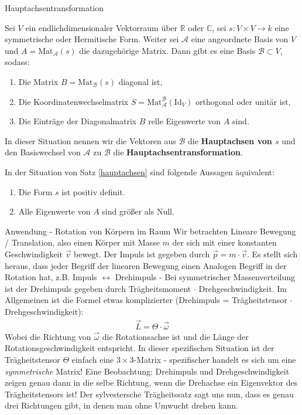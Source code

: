 \documentclass{report}
\newcommand{\tbf}[1]{\textbf{#1}}
\newcommand{\mc}[1]{\mathcal{#1}}
\newcommand{\bC}{\mathbb{C}}
\newcommand{\bR}{\mathbb{R}}
\newcommand{\vp}{\vec{p}}
\newcommand{\vv}{\vec{v}}
\newcommand{\Mat}[3]{\text{Mat}^{#1}_{#2}\left(#3\right)}
\begin{document}
\begin{section}{Hauptachsentransformation}
 \begin{theorem}
 \label{thrm:hauptachsen}
  Sei $V$ ein endlichdimensionaler Vektorraum über $\bR$ oder $\bC$, sei $s : V \times V \to k$ eine symmetrische oder Hermitische Form. Weiter sei $\mc{A}$ eine angeordnete Basis von $V$ und $A = \text{Mat}_\mc{A}(s)$ die dazugehörige Matrix. Dann gibt es eine Basis $\mc{B} \subset V$, sodass:
  \begin{enumerate}
   \item Die Matrix $B = \text{Mat}_\mc{B}(s)$ diagonal ist,
   \item Die Koordinatenwechselmatrix $S = \Mat{\mc{B}}{\mc{A}}{\text{Id}_V}$ orthogonal oder unitär ist,
   \item Die Einträge der Diagonalmatrix $B$ relle Eigenwerte von $A$ sind.
  \end{enumerate}
 \end{theorem}
 \begin{definition}
   In dieser Situation nennen wir die Vektoren aus $\mc{B}$ die \tbf{Hauptachsen von $s$} und den Basiswechsel von $\mc{A}$ zu $\mc{B}$ die \tbf{Hauptachsentransformation}.
 \end{definition}
 \begin{theorem}
  In der Situation von Satz \ref{hauptachsen} sind folgende Aussagen äquivalent:
  \begin{enumerate}
   \item Die Form $s$ ist positiv definit.
   \item Alle Eigenwerte von $A$ sind größer als Null.
  \end{enumerate}
 \end{theorem}
 \begin{subsection}{Anwendung - Rotation von Körpern im Raum}
  Wir betrachten Lineare Bewegung / Translation, also einen Körper mit Masse $m$ der sich mit einer konstanten Geschwindigkeit $\vv$ bewegt. Der Impuls ist gegeben durch $\vp = m \cdot \vv$. Es stellt sich heraus, dass jeder Begriff der linearen Bewegung einen Analogen Begriff in der Rotation hat, z.B. Impuls $\leftrightarrow$ Drehimpuls - Bei symmetrischer Massenverteilung ist der Drehimpuls gegeben durch Trägheitsmoment $\cdot$ Drehgeschwindigkeit. Im Allgemeinen ist die Formel etwas komplizierter (Drehimpuls = Trägheitstensor $\cdot$ Drehgeschwindigkeit):
  \begin{align*}
   \vec{L} = \Theta \cdot \vec{\omega}
  \end{align*}
  Wobei die Richtung von $\vec{\omega}$ die Rotationsachse ist und die Länge der Rotationsgeschwindigkeit entspricht. In dieser spezifischen Situation ist der Trägheitstensor $\Theta$ einfach eine $3 \times 3$-Matrix - spezifischer handelt es sich um eine \textit{symmetrische} Matrix! Eine Beobachtung: Drehimpuls und Drehgeschwindigkeit zeigen genau dann in die selbe Richtung, wenn die Drehachse ein Eigenvektor des Trägheitstensors ist! Der sylvestersche Trägheitssatz sagt uns nun, dass es genau drei Richtungen gibt, in denen man ohne Umwucht drehen kann.

\end{subsection}
\end{section}
\end{document}
